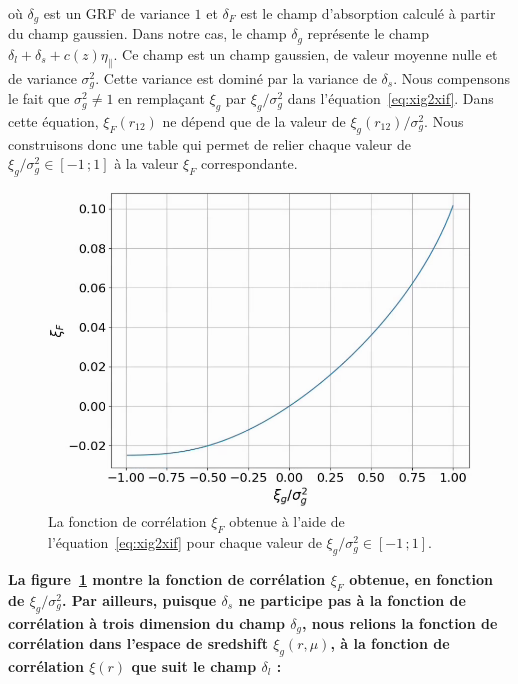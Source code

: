 \documentclass[11pt, twoside, a4paper, openright]{report}
\begin{document}
où $\delta_g$ est un GRF de variance $1$ et $\delta_F$ est le champ d'absorption calculé à partir du champ gaussien.
Dans notre cas, le champ $\delta_g$ représente le champ $\delta_l + \delta_s + c(z)\eta_{\parallel}$. Ce champ est un champ gaussien, de valeur moyenne nulle et de variance $\sigma_g^2$. Cette variance est dominé par la variance de $\delta_s$.
Nous compensons le fait que $\sigma_g^2 \neq 1$ en remplaçant $\xi_g$ par $\xi_g / \sigma_g^2$ dans l'équation~\ref{eq:xig2xif}. %
Dans cette équation, $\xi_F(r_{12})$ ne dépend que de la valeur de $\xi_g(r_{12})/ \sigma_g^2$. Nous construisons donc une table qui permet de relier chaque valeur de $\xi_g/ \sigma_g^2 \in [-1 \, ; 1]$ à la valeur $\xi_F$ correspondante.
\begin{figure}
  \centering
  \includegraphics[scale=0.4]{xiF_vs_xig}
  \caption{La fonction de corrélation $\xi_F$ obtenue à l'aide de l'équation~\ref{eq:xig2xif} pour chaque valeur de $\xi_g/ \sigma_g^2 \in [-1 \, ; 1]$.}
  \label{fig:xiF_vs_xig}
\end{figure}
\textbf{La figure~\ref{fig:xiF_vs_xig} montre la fonction de corrélation $\xi_F$ obtenue, en fonction de $\xi_g/ \sigma_g^2$.
  Par ailleurs, puisque $\delta_s$ ne participe pas à la fonction de corrélation à trois dimension du champ $\delta_g$, nous relions la fonction de corrélation dans l'espace de sredshift $\xi_g(r, \mu)$, à la fonction de corrélation $\xi(r)$ que suit le champ $\delta_l$ :}
\end{document}
